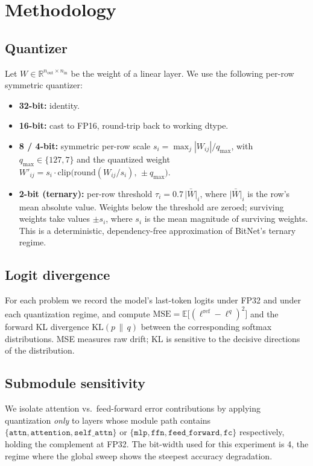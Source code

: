 \section{Methodology}

\subsection{Quantizer}
Let $W \in \mathbb{R}^{n_{\text{out}} \times n_{\text{in}}}$ be the weight
of a linear layer. We use the following per-row symmetric quantizer:
\begin{itemize}
\item \textbf{32-bit:} identity.
\item \textbf{16-bit:} cast to FP16, round-trip back to working dtype.
\item \textbf{8 / 4-bit:} symmetric per-row scale
$s_i = \max_j |W_{ij}| / q_{\max}$, with
$q_{\max}\in\{127,7\}$ and the quantized weight
$W'_{ij} = s_i \cdot \mathrm{clip}\bigl(\mathrm{round}(W_{ij}/s_i),\,\pm q_{\max}\bigr)$.
\item \textbf{2-bit (ternary):} per-row threshold $\tau_i = 0.7\,\bar{|W|}_i$,
where $\bar{|W|}_i$ is the row's mean absolute value.
Weights below the threshold are zeroed; surviving weights take values
$\pm s_i$, where $s_i$ is the mean magnitude of surviving weights.
This is a deterministic, dependency-free approximation of BitNet's
ternary regime.
\end{itemize}

\subsection{Logit divergence}
For each problem we record the model's last-token logits under FP32 and
under each quantization regime, and compute
$\mathrm{MSE} = \mathbb{E}\bigl[(\ell^{\mathrm{ref}} - \ell^{q})^2\bigr]$
and the forward KL divergence
$\mathrm{KL}(p \,\|\, q)$ between the corresponding softmax distributions.
MSE measures raw drift; KL is sensitive to the decisive directions of the
distribution.

\subsection{Submodule sensitivity}
We isolate attention vs.\ feed-forward error contributions by applying
quantization \emph{only} to layers whose module path contains
$\{\texttt{attn}, \texttt{attention}, \texttt{self\_attn}\}$ or
$\{\texttt{mlp}, \texttt{ffn}, \texttt{feed\_forward}, \texttt{fc}\}$
respectively, holding the complement at FP32.
The bit-width used for this experiment is 4, the regime where the global
sweep shows the steepest accuracy degradation.
